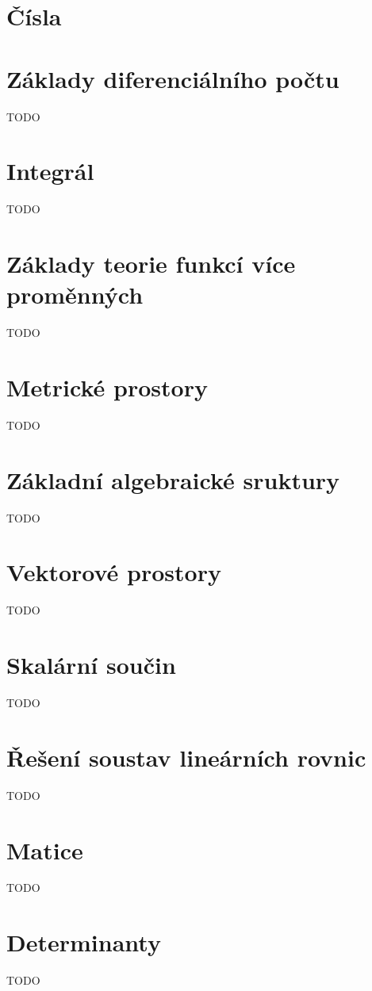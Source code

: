 


\section{Čísla}


\section{Základy diferenciálního počtu}
TODO

\section{Integrál}
TODO

\section{Základy teorie funkcí více proměnných}
TODO

\section{Metrické prostory}
TODO

\section{Základní algebraické sruktury}
TODO

\section{Vektorové prostory}
TODO

\section{Skalární součin}
TODO

\section{Řešení soustav lineárních rovnic}
TODO

\section{Matice}
TODO

\section{Determinanty}
TODO

